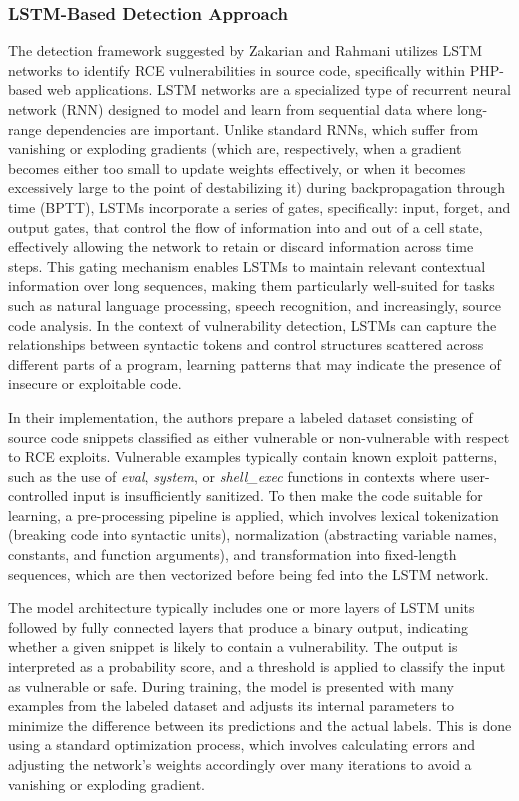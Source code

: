 \documentclass[a4paper]{usiinfbachelorproject}
\begin{document}
\subsubsection{LSTM-Based Detection Approach}
The detection framework suggested by Zakarian and Rahmani utilizes LSTM networks to identify RCE vulnerabilities in source code, specifically within PHP-based web applications. LSTM networks are a specialized type of recurrent neural network (RNN) designed to model and learn from sequential data where long-range dependencies are important. Unlike standard RNNs, which suffer from vanishing or exploding gradients (which are, respectively, when a gradient becomes either too small to update weights effectively, or when it becomes excessively large to the point of destabilizing it) during backpropagation through time (BPTT), LSTMs incorporate a series of gates, specifically: input, forget, and output gates, that control the flow of information into and out of a cell state, effectively allowing the network to retain or discard information across time steps. This gating mechanism enables LSTMs to maintain relevant contextual information over long sequences, making them particularly well-suited for tasks such as natural language processing, speech recognition, and increasingly, source code analysis. In the context of vulnerability detection, LSTMs can capture the relationships between syntactic tokens and control structures scattered across different parts of a program, learning patterns that may indicate the presence of insecure or exploitable code.

In their implementation, the authors prepare a labeled dataset consisting of source code snippets classified as either vulnerable or non-vulnerable with respect to RCE exploits. Vulnerable examples typically contain known exploit patterns, such as the use of \textit{eval}, \textit{system}, or \textit{shell\_exec} functions in contexts where user-controlled input is insufficiently sanitized. To then make the code suitable for learning, a pre-processing pipeline is applied, which involves lexical tokenization (breaking code into syntactic units), normalization (abstracting variable names, constants, and function arguments), and transformation into fixed-length sequences, which are then vectorized before being fed into the LSTM network.

The model architecture typically includes one or more layers of LSTM units followed by fully connected layers that produce a binary output, indicating whether a given snippet is likely to contain a vulnerability. The output is interpreted as a probability score, and a threshold is applied to classify the input as vulnerable or safe. During training, the model is presented with many examples from the labeled dataset and adjusts its internal parameters to minimize the difference between its predictions and the actual labels. This is done using a standard optimization process, which involves calculating errors and adjusting the network’s weights accordingly over many iterations to avoid a vanishing or exploding gradient.
\end{document}
